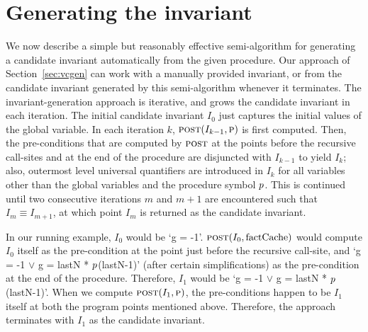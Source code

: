 \section{Generating the invariant}
\label{sec:invariant}

We now describe a simple but reasonably effective semi-algorithm for
generating a candidate invariant automatically from the given
procedure. Our approach of Section~\ref{sec:vcgen} can work with a manually
provided invariant, or from the candidate invariant generated by this
semi-algorithm whenever it terminates. The invariant-generation
approach is iterative, and
grows the candidate invariant in each iteration. The initial candidate
invariant $I_0$ just captures the initial values of the global variable. In
each iteration $k$, $\textsc{post}(I_{k-1}, \textsc{p})$ is first computed. Then, the
pre-conditions that are computed by $\textsc{post}$ at the points before the
recursive call-sites and at the end of the procedure are disjuncted with
$I_{k-1}$ to yield $I_k$; also, outermost level universal quantifiers are
introduced in $I_k$ for all variables other than the global variables and
the procedure symbol $p$.  This is continued until two consecutive
iterations $m$ and $m+1$ are encountered such that $I_m \equiv I_{m+1}$, at
which point $I_m$ is returned as the candidate invariant.

In our running example, $I_0$ would be `g = -1'. $\textsc{post}(I_0,
\mathrm{factCache})$ would compute $I_0$ itself as the pre-condition at the
point just before the recursive call-site, and `g = -1 $\vee$ g = lastN *
$p$(lastN-1)' (after certain simplifications) as the pre-condition
at the end of the
procedure. Therefore, $I_1$ would be `g = -1 $\vee$ g = lastN *
$p$(lastN-1)'. When we compute $\textsc{post}(I_1, \textsc{p})$, the
pre-conditions happen to be $I_1$ itself at both the program points
mentioned above. Therefore, the approach terminates with $I_1$ as the
candidate invariant.

